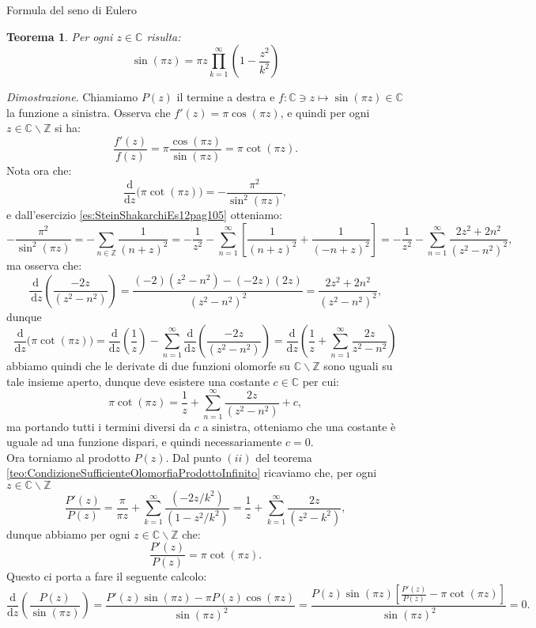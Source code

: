 \documentclass[11pt]{book}
\makeatletter
\theoremstyle{Definizione}
\theoremstyle{TeoremaProposizioneLemmaCorollarioCongettura}
\newtheorem{myteo}{Teorema}[section]
\theoremstyle{OsservazioneNotaEsempio}
\renewenvironment{proof}[1][\proofname]{\par
  \normalfont \topsep6\p@\@plus6\p@\relax
  \trivlist
  \item[\hskip\labelsep
        \itshape
    #1\@addpunct{.}]\ignorespaces
}{%
  \endtrivlist\@endpefalse
}
\renewenvironment{proof}{\textsl{Dimostrazione}.}{}
\newcommand{\Z}{\mathbb{Z}}
\newcommand{\C}{\mathbb{C}}
\newcommand{\tolto}{\smallsetminus}
\renewcommand{\d}{\mathrm{d}}
\newcommand{\dz}{\,\d z}
\makeatother
\begin{document}
\begin{boxteo}{Formula del seno di Eulero}
\begin{myteo}
Per ogni $z\in \C$ risulta:
\begin{equation}\label{eq:teo:FormulaDelSenoDiEuleroEnunciato}
\sin(\pi z) = \pi z \prod_{k = 1}^\infty \left(1-\frac{z^2}{k^2}\right)
\end{equation}
\end{myteo}
\tcblower
\begin{proof}
Chiamiamo $P(z)$ il termine a destra e $f:\C \ni z \longmapsto \sin(\pi z)\in \C$ la funzione a sinistra. Osserva che $f'(z) = \pi \cos(\pi z)$, e quindi per ogni $z\in \C\tolto \Z$ si ha:
$$
\frac{f'(z)}{f(z)} = \pi \frac{\cos(\pi z)}{\sin(\pi z)} = \pi \cot(\pi z).
$$
Nota ora che:
$$
\frac{\d}{\d z}\Big(\pi \cot(\pi z)\Big) = -\frac{\pi^2}{\sin^2(\pi z)},
$$
e dall'esercizio \ref{es:SteinShakarchiEs12pag105} otteniamo:
$$
-\frac{\pi^2}{\sin^2(\pi z)} = - \sum_{n\in \Z} \frac{1}{(n+z)^2} = -\frac{1}{z^2}-\sum_{n = 1}^\infty \left[\frac{1}{(n+z)^2}+\frac{1}{(-n+z)^2}\right] = -\frac{1}{z^2}-\sum_{n = 1}^\infty \frac{2z^2+2n^2}{(z^2-n^2)^2},
$$
ma osserva che:
$$
\frac{\d}{\dz}\left(\frac{-2z}{(z^2-n^2)}\right) = \frac{(-2)(z^2-n^2)-(-2z)(2z)}{(z^2-n^2)^2} = \frac{2z^2+2n^2}{(z^2-n^2)^2},
$$
dunque 
$$
\frac{\d}{\d z}\Big(\pi \cot(\pi z)\Big) = \frac{\d}{\d z}\left(\frac{1}{z}\right) -\sum_{n = 1}^\infty \frac{\d}{\d z}\left(\frac{-2z}{(z^2-n^2)}\right) = \frac{\d}{\d z}\left(\frac{1}{z}+\sum_{n = 1}^\infty \frac{2z}{z^2-n^2}\right)
$$
abbiamo quindi che le derivate di due funzioni olomorfe su $\C\tolto \Z$ sono uguali su tale insieme aperto, dunque deve esistere una costante $c\in \C$ per cui:
$$
\pi\cot(\pi z) = \frac{1}{z}+\sum_{n = 1}^\infty \frac{2z}{(z^2-n^2)} + c,
$$
ma portando tutti i termini diversi da $c$ a sinistra, otteniamo che una costante è uguale ad una funzione dispari, e quindi necessariamente $c = 0$.\\
Ora torniamo al prodotto $P(z)$. Dal punto $(ii)$ del teorema \ref{teo:CondizioneSufficienteOlomorfiaProdottoInfinito} ricaviamo che, per ogni $z\in \C\tolto \Z$
$$
\frac{P'(z)}{P(z)} = \frac{\pi}{\pi z}+ \sum_{k = 1}^\infty \frac{(-2z/k^2)}{(1-z^2/k^2)}= \frac{1}{z}+\sum_{k = 1}^\infty \frac{2z}{(z^2-k^2)},
$$
dunque abbiamo per ogni $z\in \C\tolto \Z$ che:
$$
\frac{P'(z)}{P(z)} = \pi \cot(\pi z).
$$
Questo ci porta a fare il seguente calcolo:
$$
\frac{\d}{\d z}\left(\frac{P(z)}{\sin(\pi z)}\right) = \frac{P'(z)\sin(\pi z)-\pi P(z) \cos(\pi z)}{\sin(\pi z)^2} = \frac{P(z)\sin(\pi z)\left[\frac{P'(z)}{P(z)}-\pi \cot(\pi  z)\right]}{\sin(\pi z)^2} = 0.
$$
\end{proof}
\end{boxteo}
\end{document}
